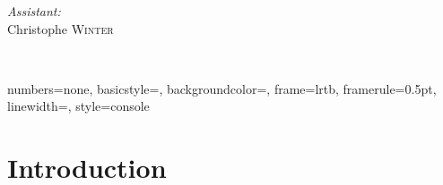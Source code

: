 \begin{titlepage}
\begin{center}
\begin{minipage}{0.4\textwidth}
\begin{flushright}
        \emph{Assistant:} \\
	Christophe \textsc{Winter}\\[0.5cm]
      \end{flushright}
    \end{minipage} \\[2cm]
     
    \vfill
     
    {\large \thedate}
     
  \end{center}

\end{titlepage}

\newpage{}

\fancyfoot{}
\lhead{}
\cfoot{\thepage}        %
\rfoot{\thedate} 


\setcounter{secnumdepth}{5}

\tableofcontents{}

\newpage

\lstset{language=C}

{
  numbers=none,
  basicstyle=\ttfamily\footnotesize,
  backgroundcolor=\color{grey97},
  frame=lrtb,
  framerule=0.5pt,
  linewidth=\textwidth,
}
{
  style=console
}

\lstset{
  style=console
}



\section*{Introduction}

